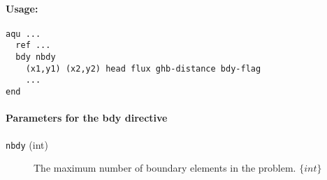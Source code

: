 \paragraph{Usage:}
\begin{verbatim}
aqu ...
  ref ... 
  bdy nbdy
    (x1,y1) (x2,y2) head flux ghb-distance bdy-flag 
    ... 
end
\end{verbatim}

\paragraph{Parameters for the \textsf{bdy} directive}
\begin{description}
\item [{\texttt{nbdy}} (int)] The maximum number of boundary elements in the problem. $\{int\}$
\end{description}

